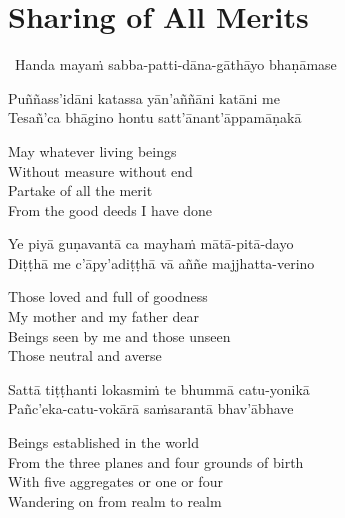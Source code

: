 \suttaRef{[Trad]}

\ifdigitalversion{}\fi



\section{Sharing of All Merits}
\label{sharing-all-merits}

\begin{leader}
  \anglebracketleft\ \hspace{-0.5mm}Handa mayaṁ sabba-patti-dāna-gāthāyo bhaṇāmase \hspace{-0.5mm}\anglebracketright\
\end{leader}

Puññass'idāni katassa yān'aññāni katāni me\\
Tesañ'ca bhāgino hontu satt'ānant'āppamāṇakā

\begin{english-verses}
  May whatever living beings\\
  Without measure without end\\
  Partake of all the merit\\
  From the good deeds I have done
\end{english-verses}

Ye piyā guṇavantā ca mayhaṁ mātā-pitā-dayo\\
Diṭṭhā me c'āpy'adiṭṭhā vā aññe majjhatta-verino

\begin{english-verses}
  Those loved and full of goodness\\
  My mother and my father dear\\
  Beings seen by me and those unseen\\
  Those neutral and averse
\end{english-verses}

Sattā tiṭṭhanti lokasmiṁ te bhummā catu-yonikā\\
Pañc'eka-catu-vokārā saṁsarantā bhav'ābhave

\begin{english-verses}
  Beings established in the world\\
  From the three planes and four grounds of birth\\
  With five aggregates or one or four\\
  Wandering on from realm to realm
\end{english-verses}

